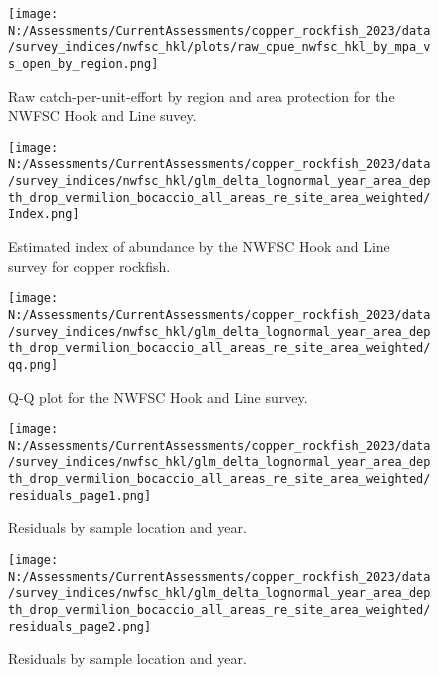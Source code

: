 \documentclass[11pt,
  english,
  letterpaper,
]{article}
\begin{document}
\newpage



\newpage

\begin{figure}
\centering
\texttt{[image: N:/Assessments/CurrentAssessments/copper\_rockfish\_2023/data/survey\_indices/nwfsc\_hkl/plots/raw\_cpue\_nwfsc\_hkl\_by\_mpa\_vs\_open\_by\_region.png]}
\caption{Raw catch-per-unit-effort by region and area protection for the NWFSC Hook and Line suvey.\label{fig:nwfsc-hkl-index-raw}}
\end{figure}

\newpage

\begin{figure}
\centering
\texttt{[image: N:/Assessments/CurrentAssessments/copper\_rockfish\_2023/data/survey\_indices/nwfsc\_hkl/glm\_delta\_lognormal\_year\_area\_depth\_drop\_vermilion\_bocaccio\_all\_areas\_re\_site\_area\_weighted/Index.png]}
\caption{Estimated index of abundance by the NWFSC Hook and Line survey for copper rockfish.\label{fig:nwfsc-hkl-index}}
\end{figure}

\newpage

\begin{figure}
\centering
\texttt{[image: N:/Assessments/CurrentAssessments/copper\_rockfish\_2023/data/survey\_indices/nwfsc\_hkl/glm\_delta\_lognormal\_year\_area\_depth\_drop\_vermilion\_bocaccio\_all\_areas\_re\_site\_area\_weighted/qq.png]}
\caption{Q-Q plot for the NWFSC Hook and Line survey.\label{fig:nwfsc-hkl-qq}}
\end{figure}

\newpage

\begin{figure}
\centering
\texttt{[image: N:/Assessments/CurrentAssessments/copper\_rockfish\_2023/data/survey\_indices/nwfsc\_hkl/glm\_delta\_lognormal\_year\_area\_depth\_drop\_vermilion\_bocaccio\_all\_areas\_re\_site\_area\_weighted/residuals\_page1.png]}
\caption{Residuals by sample location and year.\label{fig:nwfsc-hkl-resid-1}}
\end{figure}

\newpage

\begin{figure}
\centering
\texttt{[image: N:/Assessments/CurrentAssessments/copper\_rockfish\_2023/data/survey\_indices/nwfsc\_hkl/glm\_delta\_lognormal\_year\_area\_depth\_drop\_vermilion\_bocaccio\_all\_areas\_re\_site\_area\_weighted/residuals\_page2.png]}
\caption{Residuals by sample location and year.\label{fig:nwfsc-hkl-resid-2}}
\end{figure}
\end{document}

